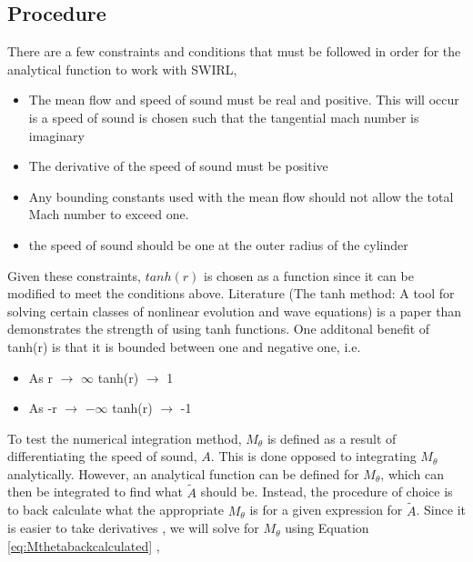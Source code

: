 
\subsection{Procedure}
There are a few constraints and conditions that must be followed in order for the analytical 
function to work with SWIRL, 

\begin{itemize}
    \item The mean flow and speed of sound must be real and positive. This will 
        occur is a speed of sound is chosen such that the tangential mach number
        is imaginary
    \item The derivative of the speed of sound must be positive
    \item Any bounding constants used with the mean flow should not allow the 
        total Mach number to exceed one.
    \item the speed of sound should be one at the outer radius of the cylinder
\end{itemize}

Given these constraints, $tanh(r)$ is chosen as a function since it can be
modified to meet the conditions above. Literature (The tanh method: A tool for 
solving certain classes of nonlinear evolution and wave equations) 
is a paper than demonstrates the strength of using tanh functions.
One additonal benefit of tanh(r) is that it is bounded between one and negative one, i.e.

\begin{itemize}
    \item As r $\rightarrow$ $\infty$ tanh(r) $\rightarrow$ 1
    \item As -r $\rightarrow$ $-\infty$ tanh(r) $\rightarrow$ -1
\end{itemize}

To test the numerical integration method,  $M_{\theta}$ is defined as a result 
of differentiating the speed of sound, $A$. This is done opposed to integrating
$M_{\theta}$ analytically. However, an analytical function can be defined for
$M_{\theta}$, which can then be integrated to find what $\widetilde{A}$ should be. 
Instead, the procedure of choice is to back calculate what the appropriate 
$M_{\theta}$ is for a given expression for $\widetilde{A}$.  Since it is easier 
to take derivatives , we will solve for $M_{\theta}$ using Equation \ref{eq:Mthetabackcalculated} ,


